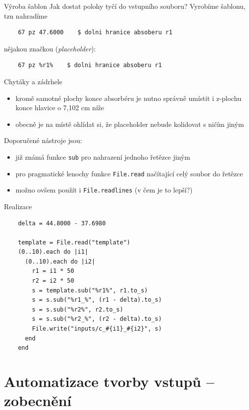 \documentclass{beamer}
\begin{document}
\begin{frame}[fragile]{Výroba šablon}
  Jak dostat polohy tyčí do vstupního souboru? Vyrobíme šablonu, tzn nahradíme
  \begin{verbatim}
    67 pz 47.6000    $ dolni hranice absoberu r1
  \end{verbatim}
  \pause
  nějakou značkou (\emph{placeholder}):
  \begin{verbatim}
    67 pz %r1%    $ dolni hranice absoberu r1
  \end{verbatim}
\end{frame}

\begin{frame}{Chytáky a zádrhele}
  \begin{itemize}
    \item kromě samotné plochy konce absorbéru je nutno správně umístit i z-plochu konce hlavice o 7,102 cm níže
    \item obecně je na místě ohlídat si, že placeholder nebude kolidovat s ničím jiným
  \end{itemize}
  Doporučené nástroje jsou:
  \begin{itemize}
    \item již známá funkce \texttt{sub} pro nahrazení jednoho řetězce jiným
    \item pro pragmatické lenochy funkce \texttt{File.read} načítající celý soubor do řetězce
    \item možno ovšem použít i \texttt{File.readlines} (v čem je to lepší?)
  \end{itemize}
\end{frame}

\begin{frame}[fragile]{Realizace}
  \scriptsize
  \begin{verbatim}
    delta = 44.8000 - 37.6980

    template = File.read("template")
    (0..10).each do |i1|
      (0..10).each do |i2|
        r1 = i1 * 50
        r2 = i2 * 50
        s = template.sub("%r1%", r1.to_s)
        s = s.sub("%r1_%", (r1 - delta).to_s)
        s = s.sub("%r2%", r2.to_s)
        s = s.sub("%r2_%", (r2 - delta).to_s)
        File.write("inputs/c_#{i1}_#{i2}", s)
      end
    end
  \end{verbatim}
\end{frame}

\section{Automatizace tvorby vstupů -- zobecnění}
\end{document}
